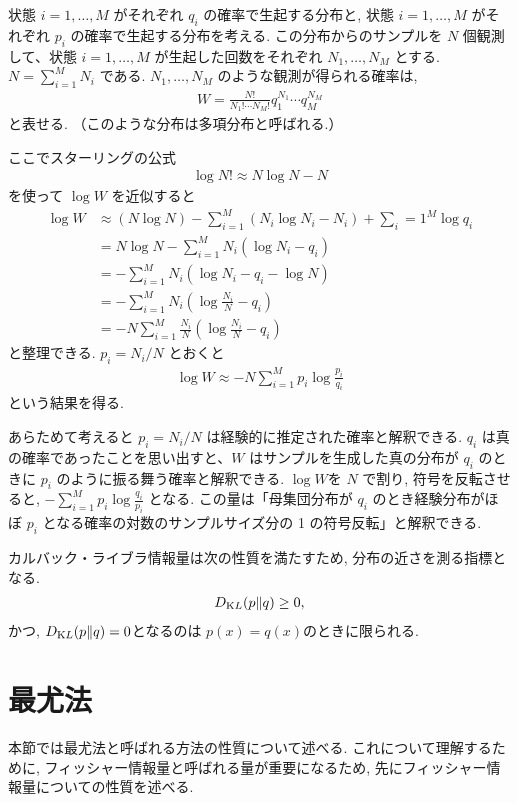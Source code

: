 \documentclass{jarticle}
\begin{document}
状態 $i=1,\ldots,M$ がそれぞれ $q_i$ の確率で生起する分布と, 状態 $i=1,\ldots,M$ がそれぞれ $p_i$ の確率で生起する分布を考える. この分布からのサンプルを $N$ 個観測して、状態 $i=1,\ldots,M$ が生起した回数をそれぞれ $N_1,\ldots,N_M$ とする. $ N=\sum_{i=1}^{M}N_i$ である. 
$N_1,\ldots,N_M$ のような観測が得られる確率は,
\begin{align}
W=\frac{N!}{N_1! \cdots N_M!}q^{N_1}_1 \cdots q^{N_M}_M
\end{align}
と表せる. （このような分布は多項分布と呼ばれる.）

ここでスターリングの公式
\begin{align}
\log N! \approx N\log N -N
\end{align}
を使って $\log W$ を近似すると
\begin{align}
\log W &\approx (N \log N) - \sum_{i=1}^{M}( N_i \log N_i -N_i) + \sum_i=1^{M} \log q_i \\
&= N \log N - \sum_{i=1}^M N_i (\log N_i - q_i) \\
&= - \sum_{i=1}^M N_i (\log N_i - q_i -\log N ) \\
&= - \sum_{i=1}^M N_i (\log \frac{N_i}{N} - q_i) \\
&= - N \sum_{i=1}^M \frac{N_i}{N} (\log \frac{N_i}{N} - q_i) 
\end{align}
と整理できる.
$p_i = N_i/N$ とおくと
\begin{align}
\log W \approx -N\sum_{i=1}^{M}p_i \log\frac{p_i}{q_i}
\end{align}
という結果を得る.

あらためて考えると $p_i = N_i/N$  は経験的に推定された確率と解釈できる.
$q_i$ は真の確率であったことを思い出すと、$W$ はサンプルを生成した真の分布が $q_i$ のときに $p_i$ のように振る舞う確率と解釈できる. 
$\log W$を $N$ で割り, 符号を反転させると, $-\sum_{i=1}^{M} p_i \log {\frac {q_i}{p_i}}$ となる.
この量は「母集団分布が $q_i$ のとき経験分布がほぼ $p_i$ となる確率の対数のサンプルサイズ分の 1 の符号反転」と解釈できる.

カルバック・ライブラ情報量は次の性質を満たすため, 分布の近さを測る指標となる. 
\begin{align}
D_{\mathrm KL}(p\|q) \ge 0,
\end{align}
かつ, $D_{\mathrm KL}(p\|q) = 0$となるのは $p(x)=q(x)$のときに限られる.


\section{最尤法}
本節では最尤法と呼ばれる方法の性質について述べる. これについて理解するために, フィッシャー情報量と呼ばれる量が重要になるため, 先にフィッシャー情報量についての性質を述べる. 
\end{document}
